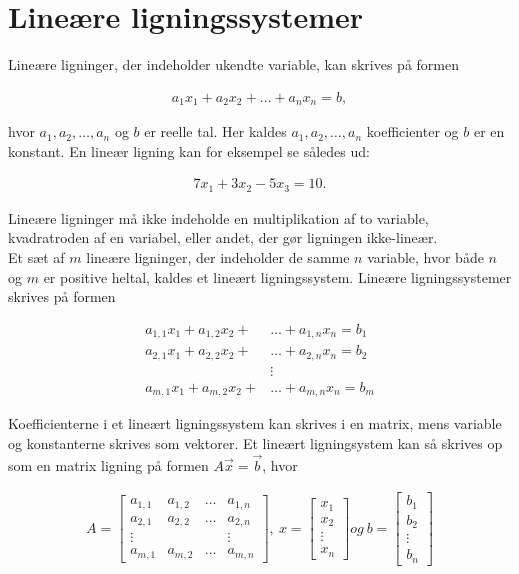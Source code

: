 \section{Lineære ligningssystemer}\label{afsnit:lign_sys}
Lineære ligninger, der indeholder ukendte variable, kan skrives på formen

\begin{align*}
a_1x_1+a_2x_2+ \dots +a_nx_n = b,
\end{align*}

hvor $a_1, a_2, \dots , a_n$ og $b$ er reelle tal. 
Her kaldes $a_1,a_2, \dots , a_n$ koefficienter og $b$ er en konstant. En lineær ligning kan for eksempel se således ud:

\begin{align*}
7x_1+3x_2-5x_3 = 10.
\end{align*}

Lineære ligninger må ikke indeholde en multiplikation af to variable, kvadratroden af en variabel, eller andet, der gør ligningen ikke-lineær. \\
Et sæt af $m$ lineære ligninger, der indeholder de samme $n$ variable, hvor både $n$ og $m$ er positive heltal, kaldes et lineært ligningssystem. Lineære ligningssystemer skrives på formen

\begin{align*}
a_{1,1}x_1+a_{1,2}x_2+ &\dots +a_{1,n}x_n = b_1\\
a_{2,1}x_1+a_{2,2}x_2+ &\dots +a_{2,n}x_n = b_2\\
&\vdots \\
a_{m,1}x_1+a_{m,2}x_2+ &\dots +a_{m,n}x_n = b_m
\end{align*}

Koefficienterne i et lineært ligningssystem kan skrives i en matrix, mens variable og konstanterne skrives som vektorer. Et lineært ligningsystem kan så skrives op som en matrix ligning på formen $A \vec{x} = \vec{b}$, hvor

\begin{align*}
A= \begin{bmatrix}
a_{1,1} & a_{1,2} & \dots & a_{1,n} \\
a_{2,1} & a_{2,2} & \dots & a_{2,n} \\
\vdots  &         &       & \vdots  \\
a_{m,1} & a_{m,2} & \dots & a_{m,n}
\end{bmatrix}, \ 
x= \begin{bmatrix}
x_1 \\
x_2 \\
\vdots \\
x_n
\end{bmatrix} og \ 
b= \begin{bmatrix}
b_1 \\
b_2 \\
\vdots \\
b_n
\end{bmatrix}
\end{align*}

